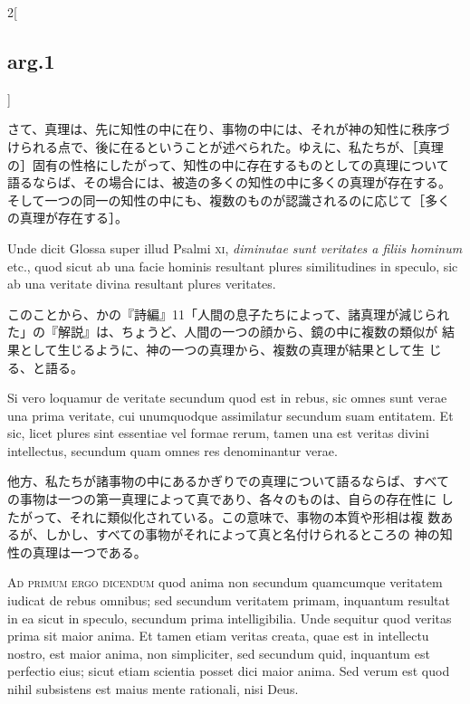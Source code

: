 \documentclass[paper=a4paper,fontsize=10pt,jafontsize=9pt,titlepage]{jlreq}
\begin{document}
\begin{paracol}{2}[\subsection{arg.1}]
\switchcolumn

さて、真理は、先に知性の中に在り、事物の中には、それが神の知性に秩序づ
けられる点で、後に在るということが述べられた。ゆえに、私たちが、［真理
の］固有の性格にしたがって、知性の中に存在するものとしての真理について
語るならば、その場合には、被造の多くの知性の中に多くの真理が存在する。
そして一つの同一の知性の中にも、複数のものが認識されるのに応じて［多く
の真理が存在する］。

\switchcolumn*


Unde dicit Glossa super illud Psalmi {\scshape xi}, {\itshape
diminutae sunt veritates a filiis hominum} etc., quod sicut ab una
facie hominis resultant plures similitudines in speculo, sic ab una
veritate divina resultant plures veritates.

\switchcolumn

このことから、かの『詩編』11「人間の息子たちによって、諸真理が減じられ
 た」の『解説』は、ちょうど、人間の一つの顔から、鏡の中に複数の類似が
 結果として生じるように、神の一つの真理から、複数の真理が結果として生
 じる、と語る。

\switchcolumn*


Si vero loquamur de veritate secundum quod est in rebus, sic omnes
sunt verae una prima veritate, cui unumquodque assimilatur secundum
suam entitatem. Et sic, licet plures sint essentiae vel formae rerum,
tamen una est veritas divini intellectus, secundum quam omnes res
denominantur verae.

\switchcolumn

他方、私たちが諸事物の中にあるかぎりでの真理について語るならば、すべて
 の事物は一つの第一真理によって真であり、各々のものは、自らの存在性に
 したがって、それに類似化されている。この意味で、事物の本質や形相は複
 数あるが、しかし、すべての事物がそれによって真と名付けられるところの
 神の知性の真理は一つである。

\switchcolumn*[\subsection{ad.1}]


{\scshape Ad primum ergo dicendum} quod anima non secundum quamcumque
veritatem iudicat de rebus omnibus; sed secundum veritatem primam,
inquantum resultat in ea sicut in speculo, secundum prima
intelligibilia. Unde sequitur quod veritas prima sit maior anima. Et
tamen etiam veritas creata, quae est in intellectu nostro, est maior
anima, non simpliciter, sed secundum quid, inquantum est perfectio
eius; sicut etiam scientia posset dici maior anima. Sed verum est quod
nihil subsistens est maius mente rationali, nisi Deus.


\end{paracol}
\end{document}

